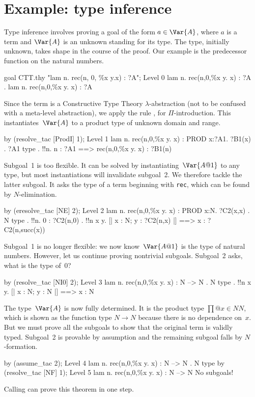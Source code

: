 \section{Example: type inference}
Type inference involves proving a goal of the form $a\in\Var{A}$, where $a$
is a term and $\Var{A}$ is an unknown standing for its type.  The type,
initially
unknown, takes shape in the course of the proof.  Our example is the
predecessor function on the natural numbers.
\begin{ttbox}
goal CTT.thy "lam n. rec(n, 0, \%x y.x) : ?A";
{\out Level 0}
{\out lam n. rec(n,0,\%x y. x) : ?A}
{. lam n. rec(n,0,\%x y. x) : ?A}
\end{ttbox}
Since the term is a Constructive Type Theory $\lambda$-abstraction (not to
be confused with a meta-level abstraction), we apply the rule
, for $\Pi$-introduction.  This instantiates~$\Var{A}$ to a
product type of unknown domain and range.
\begin{ttbox}
by (resolve_tac [ProdI] 1);
{\out Level 1}
{\out lam n. rec(n,0,\%x y. x) : PROD x:?A1. ?B1(x)}
{. ?A1 type}
{. !!n. n : ?A1 ==> rec(n,0,\%x y. x) : ?B1(n)}
\end{ttbox}
Subgoal~1 is too flexible.  It can be solved by instantiating~$\Var{A@1}$
to any type, but most instantiations will invalidate subgoal~2.  We
therefore tackle the latter subgoal.  It asks the type of a term beginning
with {\tt rec}, which can be found by $N$-elimination.%
\begin{ttbox}
by (eresolve_tac [NE] 2);
{\out Level 2}
{\out lam n. rec(n,0,\%x y. x) : PROD x:N. ?C2(x,x)}
{. N type}
{. !!n. 0 : ?C2(n,0)}
{. !!n x y. [| x : N; y : ?C2(n,x) |] ==> x : ?C2(n,succ(x))}
\end{ttbox}
Subgoal~1 is no longer flexible: we now know~$\Var{A@1}$ is the type of
natural numbers.  However, let us continue proving nontrivial subgoals.
Subgoal~2 asks, what is the type of~0?
\begin{ttbox}
by (resolve_tac [NI0] 2);
{\out Level 3}
{\out lam n. rec(n,0,\%x y. x) : N --> N}
{. N type}
{. !!n x y. [| x : N; y : N |] ==> x : N}
\end{ttbox}
The type~$\Var{A}$ is now fully determined.  It is the product type
$\prod@{x\in N}N$, which is shown as the function type $N\to N$ because
there is no dependence on~$x$.  But we must prove all the subgoals to show
that the original term is validly typed.  Subgoal~2 is provable by
assumption and the remaining subgoal falls by $N$-formation.%
\begin{ttbox}
by (assume_tac 2);
{\out Level 4}
{\out lam n. rec(n,0,\%x y. x) : N --> N}
{. N type}
\ttbreak
by (resolve_tac [NF] 1);
{\out Level 5}
{\out lam n. rec(n,0,\%x y. x) : N --> N}
{\out No subgoals!}
\end{ttbox}
Calling  can prove this theorem in one step.

